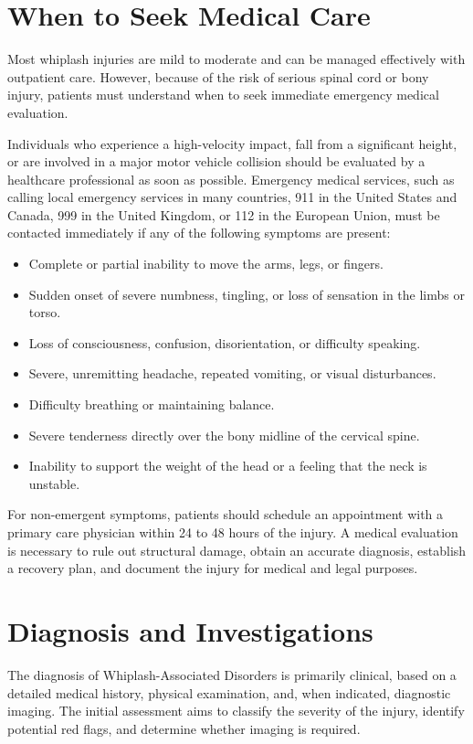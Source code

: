 \section*{When to Seek Medical Care}
Most whiplash injuries are mild to moderate and can be managed effectively with outpatient care. However, because of the risk of serious spinal cord or bony injury, patients must understand when to seek immediate emergency medical evaluation.

Individuals who experience a high-velocity impact, fall from a significant height, or are involved in a major motor vehicle collision should be evaluated by a healthcare professional as soon as possible. Emergency medical services, such as calling local emergency services in many countries, 911 in the United States and Canada, 999 in the United Kingdom, or 112 in the European Union, must be contacted immediately if any of the following symptoms are present:
\begin{itemize}
    \item Complete or partial inability to move the arms, legs, or fingers.
    \item Sudden onset of severe numbness, tingling, or loss of sensation in the limbs or torso.
    \item Loss of consciousness, confusion, disorientation, or difficulty speaking.
    \item Severe, unremitting headache, repeated vomiting, or visual disturbances.
    \item Difficulty breathing or maintaining balance.
    \item Severe tenderness directly over the bony midline of the cervical spine.
    \item Inability to support the weight of the head or a feeling that the neck is unstable.
\end{itemize}

For non-emergent symptoms, patients should schedule an appointment with a primary care physician within 24 to 48 hours of the injury. A medical evaluation is necessary to rule out structural damage, obtain an accurate diagnosis, establish a recovery plan, and document the injury for medical and legal purposes.

\section*{Diagnosis and Investigations}
The diagnosis of Whiplash-Associated Disorders is primarily clinical, based on a detailed medical history, physical examination, and, when indicated, diagnostic imaging. The initial assessment aims to classify the severity of the injury, identify potential red flags, and determine whether imaging is required.

